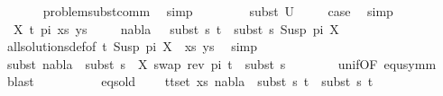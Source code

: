 \begin{isabellebody}
\ \ \ \ \ \isamarkupfalse%
\ problem{\isacharunderscore}{\kern0pt}subst{\isacharunderscore}{\kern0pt}comm\ \isamarkupfalse%
\ simp\isanewline
\ \ \ \isanewline
\ \ \ \isamarkupfalse%
\ subst\ U\isanewline
\ \ \ \isamarkupfalse%
\ {\isacharquery}{\kern0pt}case\ \isamarkupfalse%
\ simp\isanewline
\ \isamarkupfalse%
\isanewline
\ \ \ \isamarkupfalse%
\ {\isacharparenleft}{\kern0pt}{}\ X\ t{\isacharprime}{\kern0pt}\ pi\ xs\ ys{\isacharparenright}{\kern0pt}\isanewline
\ \ \ \isamarkupfalse%
\ {\isachardoublequoteopen}nabla{}\ {\isasymturnstile}\ \ subst\ s{}\ t{\isacharprime}{\kern0pt}\ {\isasymapprox}\ subst\ s{}\ {\isacharparenleft}{\kern0pt}Susp\ pi\ X{\isacharparenright}{\kern0pt}{\isachardoublequoteclose}\isanewline
\ \ \ \ \ \isamarkupfalse%
\ all{\isacharunderscore}{\kern0pt}solutions{\isacharunderscore}{\kern0pt}def{\isacharbrackleft}{\kern0pt}of\ {\isacartoucheopen}{\isacharparenleft}{\kern0pt}{\isacharparenleft}{\kern0pt}t{\isacharprime}{\kern0pt}{\isacharcomma}{\kern0pt}\ Susp\ pi\ X{\isacharparenright}{\kern0pt}\ {\isacharhash}{\kern0pt}\ xs{\isacharcomma}{\kern0pt}\ ys{\isacharparenright}{\kern0pt}{\isacartoucheclose}{\isacharbrackright}{\kern0pt}\ \isamarkupfalse%
\ simp\isanewline
\ \ \ \isamarkupfalse%
\ subst{\isacharcolon}{\kern0pt}\ {\isachardoublequoteopen}nabla{}\ {\isasymTurnstile}\ subst\ {\isacharparenleft}{\kern0pt}s{}\ {\isasymbullet}\ {\isacharbrackleft}{\kern0pt}{\isacharparenleft}{\kern0pt}X{\isacharcomma}{\kern0pt}\ swap\ {\isacharparenleft}{\kern0pt}rev\ pi{\isacharparenright}{\kern0pt}\ t{\isacharprime}{\kern0pt}{\isacharparenright}{\kern0pt}{\isacharbrackright}{\kern0pt}{\isacharparenright}{\kern0pt}\ {\isasymapprox}\ subst\ s{}\ {\isachardoublequoteclose}\isanewline
\ \ \ \ \ \isamarkupfalse%
\ unif{\isacharunderscore}{\kern0pt}{}{\isacharbrackleft}{\kern0pt}OF\ equ{\isacharunderscore}{\kern0pt}symm{\isacharbrackright}{\kern0pt}\ \isamarkupfalse%
\ blast\isanewline
\isanewline
\ \ \ \isamarkupfalse%
\ {}\isanewline
\ \ \ \isamarkupfalse%
\ eqs{\isacharunderscore}{\kern0pt}old{\isacharcolon}{\kern0pt}\isanewline
\ \ \ \ {\isachardoublequoteopen}{\isasymforall}{\isacharparenleft}{\kern0pt}t{}{\isacharcomma}{\kern0pt}t{}{\isacharparenright}{\kern0pt}{\isasymin}set\ xs{\isachardot}{\kern0pt}\ nabla{}\ {\isasymturnstile}\ subst\ s{}\ t{}\ {\isasymapprox}\ subst\ s{}\ t{}{\isachardoublequoteclose}\isanewline

\end{isabellebody}
